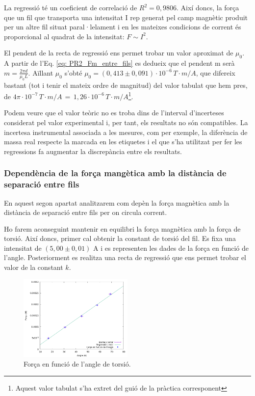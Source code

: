\documentclass[11pt]{article}
\numberwithin{equation}{section}
\numberwithin{figure}{section}
\numberwithin{table}{section}
\begin{document}
La regressió té un coeficient de correlació de $R^2 = 0,9806$. Així doncs, la força que un fil que transporta una intensitat I rep generat pel camp magnètic produit per un altre fil situat paral·lelament i en les mateixes condicions de corrent és proporcional al quadrat de la intensitat: $F \sim I^2$.

El pendent de la recta de regressió ens permet trobar un valor aproximat de $\mu_0$. A partir de l’Eq. \eqref{eq: PR2_Fm_entre_fils} es dedueix que el pendent m serà $m = \frac{2\pi d}{\mu_0 L}$.
Aïllant $\mu_0$ s’obté $\mu_0 = (0,413 \pm 0,091) · 10^{-6}\, T · m/A$, que difereix bastant (tot i tenir el mateix ordre de magnitud) del valor tabulat que hem pres, de $4\pi \cdot 10^{-7}\, T \cdot m/A \,=\, 1,26 \cdot 10^{-6}\, T\cdot m/A$\footnote{Aquest valor tabulat s'ha extret del guió de la pràctica corresponent}. 

Podem veure que el valor teòric no es troba dins de l’interval d’incerteses considerat pel valor experimental i, per tant, els resultats no són compatibles. La incertesa instrumental associada a les mesures, com per exemple, la diferència de massa real respecte la marcada en les etiquetes i el que s'ha utilitzat per fer les regressions fa augmentar la discrepància entre els resultats. 

\subsubsection{Dependència de la força mangètica amb la distància de separació entre fils}\label{sec: PR2_Fm_sep}

En aquest segon apartat analitzarem com depèn la força magnètica amb la distància de separació entre fils per on circula corrent. 

Ho farem aconseguint mantenir en equilibri la força magnètica amb la força de torsió. Així doncs, primer cal obtenir la constant de torsió del fil. Es fixa una intensitat de $(5,00 ± 0,01)$ A i es representen les dades de la força en funció de l’angle. Posteriorment es realitza una recta de regressió que ens permet trobar el valor de la constant $k$.

\begin{figure}[H]
    \centering
    \includegraphics[width=0.5\textwidth]{PR2_regr_Fvstheta.png}
    \caption{Força en funció de l'angle de torsió.}
    \label{fig: PR2_regr_Fvstheta}
\end{figure}
\end{document}
